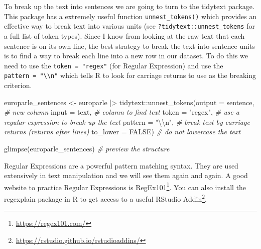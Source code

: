 \documentclass[
  letterpaper,
  DIV=11,
  numbers=noendperiod]{scrreport}
\newenvironment{Shaded}{\begin{snugshade}}{\end{snugshade}}
\newcommand{\AttributeTok}[1]{\textcolor[rgb]{0.00,0.00,0.00}{#1}}
\newcommand{\CommentTok}[1]{\textcolor[rgb]{0.00,0.00,0.00}{\textit{#1}}}
\newcommand{\ConstantTok}[1]{\textcolor[rgb]{0.00,0.00,0.00}{#1}}
\newcommand{\FunctionTok}[1]{\textcolor[rgb]{0.00,0.00,0.00}{#1}}
\newcommand{\NormalTok}[1]{\textcolor[rgb]{0.00,0.00,0.00}{#1}}
\newcommand{\OtherTok}[1]{\textcolor[rgb]{0.00,0.00,0.00}{#1}}
\newcommand{\SpecialCharTok}[1]{\textcolor[rgb]{0.00,0.00,0.00}{#1}}
\newcommand{\StringTok}[1]{\textcolor[rgb]{0.00,0.00,0.00}{#1}}
\theoremstyle{definition}
\theoremstyle{remark}
\DeclareRobustCommand{\href}[2]{#2\footnote{\url{#1}}}
\begin{document}
To break up the text into sentences we are going to turn to the tidytext
package. This package has a extremely useful function
\texttt{unnest\_tokens()} which provides an effective way to break text
into various units (see \texttt{?tidytext::unnest\_tokens} for a full
list of token types). Since I know from looking at the raw text that
each sentence is on its own line, the best strategy to break the text
into sentence units is to find a way to break each line into a new row
in our dataset. To do this we need to use the \texttt{token\ =\ "regex"}
(for Regular Expression) and use the
\texttt{pattern\ =\ "\textbackslash{}\textbackslash{}n"} which tells R
to look for carriage returns to use as the breaking criterion.

\begin{Shaded}
\begin{Highlighting}[]
\NormalTok{europarle\_sentences }\OtherTok{\textless{}{-}} 
\NormalTok{  europarle }\SpecialCharTok{|\textgreater{}} 
\NormalTok{  tidytext}\SpecialCharTok{::}\FunctionTok{unnest\_tokens}\NormalTok{(}\AttributeTok{output =}\NormalTok{ sentence, }\CommentTok{\# new column}
                          \AttributeTok{input =}\NormalTok{ text, }\CommentTok{\# column to find text}
                          \AttributeTok{token =} \StringTok{"regex"}\NormalTok{, }\CommentTok{\# use a regular expression to break up the text}
                          \AttributeTok{pattern =} \StringTok{"}\SpecialCharTok{\textbackslash{}\textbackslash{}}\StringTok{n"}\NormalTok{, }\CommentTok{\# break text by carriage returns (returns after lines)}
                          \AttributeTok{to\_lower =} \ConstantTok{FALSE}\NormalTok{) }\CommentTok{\# do not lowercase the text}

\FunctionTok{glimpse}\NormalTok{(europarle\_sentences) }\CommentTok{\# preview the structure}
\end{Highlighting}
\end{Shaded}

\begin{tcolorbox}[enhanced jigsaw, breakable, arc=.35mm, opacityback=0, bottomrule=.15mm, colback=white, opacitybacktitle=0.6, colframe=quarto-callout-warning-color-frame, toptitle=1mm, colbacktitle=quarto-callout-warning-color!10!white, left=2mm, leftrule=.75mm, toprule=.15mm, title=\textcolor{quarto-callout-warning-color}{\faExclamationTriangle}\hspace{0.5em}{Tip}, bottomtitle=1mm, coltitle=black, titlerule=0mm, rightrule=.15mm]

Regular Expressions are a powerful pattern matching syntax. They are
used extensively in text manipulation and we will see them again and
again. A good website to practice Regular Expressions is
\href{https://regex101.com/}{RegEx101}. You can also install the
regexplain package in R to get access to a useful
\href{https://rstudio.github.io/rstudioaddins/}{RStudio Addin}.

\end{tcolorbox}
\end{document}
